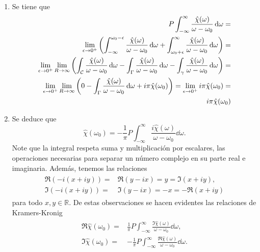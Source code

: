 \documentclass{article}
\begin{document}
\begin{enumerate}
\item Se tiene que
\begin{align}
\begin{split}
P\int_{-\infty}^\infty\frac{\hat{\chi}(\omega)}{\omega-\omega_0}\dd{\omega}=&\\
\lim_{\epsilon\rightarrow 0^+}\qty(\int_{-\infty}^{\omega_0-\epsilon}\frac{\hat{\chi}(\omega)}{\omega-\omega_0}\dd{\omega}+\int_{\omega_0+\epsilon}^\infty\frac{\hat{\chi}(\omega)}{\omega-\omega_0}\dd{\omega})=&\\
\lim_{\epsilon\rightarrow 0^+}\lim_{R\rightarrow\infty}\qty(\int_\mathcal{C}\frac{\hat{\chi}(\omega)}{\omega-\omega_0}\dd{\omega}-\int_\Gamma\frac{\hat{\chi}(\omega)}{\omega-\omega_0}\dd{\omega}-\int_\gamma\frac{\hat{\chi}(\omega)}{\omega-\omega_0}\dd{\omega})=&\\
\lim_{\epsilon\rightarrow 0^+}\lim_{R\rightarrow\infty}\qty(0-\int_\Gamma\frac{\hat{\chi}(\omega)}{\omega-\omega_0}\dd{\omega}+i\pi\hat{\chi}(\omega_0))=\lim_{\epsilon\rightarrow 0^+}i\pi\hat{\chi}(\omega_0)=&\\
i\pi\hat{\chi}(\omega_0)
\end{split}
\end{align}

\item Se deduce que
\begin{equation}
\hat{\chi}(\omega_0)=-\frac{1}{\pi}P\int_{-\infty}^\infty\frac{i\hat{\chi}(\omega)}{\omega-\omega_0}\dd{\omega}.
\end{equation}
Note que la integral respeta suma y multiplicación por escalares, las operaciones necesarias para separar un número complejo en su parte real e imaginaria. Además, tenemos las relaciones
\begin{align}
\begin{split}
\Re(-i(x+iy))=&\Re(y-ix)=y=\Im(x+iy),\\
\Im(-i(x+iy))=&\Im(y-ix)=-x=-\Re(x+iy)
\end{split}
\end{align}
para todo $x,y\in\mathbb{R}$. De estas observaciones se hacen evidentes las relaciones de Kramers-Kronig
\begin{align}
\begin{split}
\Re\hat{\chi}(\omega_0)=&\frac{1}{\pi}P\int_{-\infty}^\infty\frac{\Im\hat{\chi}(\omega)}{\omega-\omega_0}\dd{\omega},\\
\Im\hat{\chi}(\omega_0)=&-\frac{1}{\pi}P\int_{-\infty}^\infty\frac{\Re\hat{\chi}(\omega)}{\omega-\omega_0}\dd{\omega}.
\end{split}
\end{align}

\end{enumerate}
\end{document}
